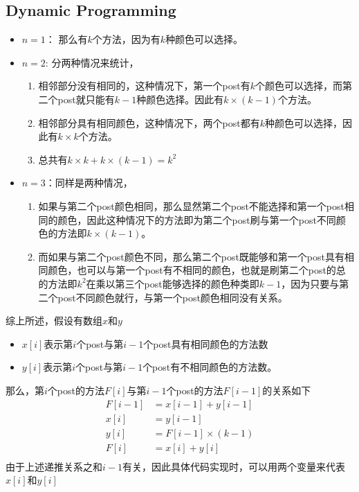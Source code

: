 \subsection{Dynamic Programming}
\begin{itemize}
\item $n=1$： 那么有$k$个方法，因为有$k$种颜色可以选择。
\item $n=2$: 分两种情况来统计，
\begin{enumerate}
\item 相邻部分没有相同的，这种情况下，第一个post有$k$个颜色可以选择，而第二个post就只能有$k-1$种颜色选择。因此有$k\times (k-1)$个方法。
\item 相邻部分具有相同颜色，这种情况下，两个post都有$k$种颜色可以选择，因此有$k\times k$个方法。
\item 总共有$k\times k+k\times(k-1) = k^2$
\end{enumerate}
\item $n=3$：同样是两种情况，\begin{enumerate}
\item 如果与第二个post颜色相同，那么显然第二个post不能选择和第一个post相同的颜色，因此这种情况下的方法即为第二个post刷与第一个post不同颜色的方法即$k\times(k-1)$。
\item 而如果与第二个post颜色不同，那么第二个post既能够和第一个post具有相同颜色，也可以与第一个post有不相同的颜色，也就是刷第二个post的总的方法即$k^2$在乘以第三个post能够选择的颜色种类即$k-1$，因为只要与第二个post不同颜色就行，与第一个post颜色相同没有关系。
\end{enumerate}
\end{itemize}
综上所述，假设有数组$x$和$y$
\begin{itemize}
\item $x[i]$表示第$i$个post与第$i-1$个post具有相同颜色的方法数
\item $y[i]$表示第$i$个post与第$i-1$个post有不相同颜色的方法数。
\end{itemize}
那么，第$i$个post的方法$F[i]$与第$i-1$个post的方法$F[i-1]$的关系如下
\begin{align*}
F[i-1] &= x[i-1] + y[i-1]\\
x[i] &= y[i-1]\\
y[i] &= F[i-1]\times(k-1)\\
F[i] &= x[i] + y[i]\\
\end{align*}
由于上述递推关系之和$i-1$有关，因此具体代码实现时，可以用两个变量来代表$x[i]$和$y[i]$
\setcounter{algorithm}{0}
